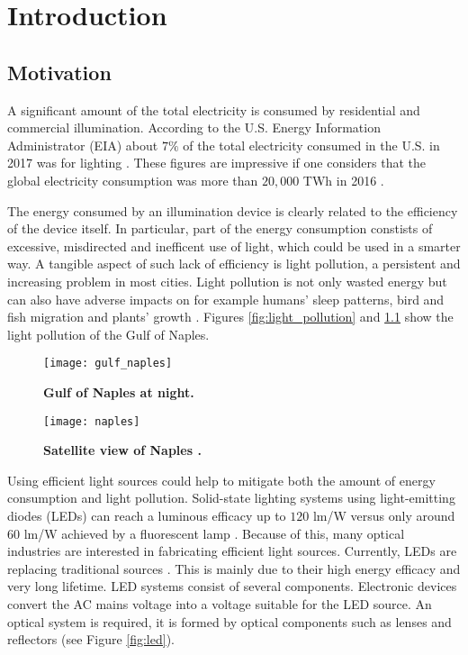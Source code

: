 \chapter{Introduction}
\section{Motivation}
A significant amount of the total electricity is consumed by residential and commercial illumination.
According to the U.S. Energy Information Administrator (EIA) about $7\%$ of the total electricity consumed in the U.S. in 2017 was for lighting \cite{electricity_light}. These figures are impressive if one considers that the global electricity consumption was more than $20,000$ TWh in 2016 \cite{statistic}. 

The energy consumed by an illumination device is clearly related to the efficiency of the device itself. 
In particular, part of the energy consumption constists of excessive, misdirected and inefficent use of light, which could be used in a smarter way. A tangible aspect of such lack of efficiency is light pollution, a persistent and increasing problem in most cities. Light pollution is not only wasted energy but can also have adverse impacts on for example humans’ sleep patterns, bird and fish migration and plants’ growth \cite{bergesen2016potential}. Figures \ref{fig:light_pollution} and \ref{fig:light_pollution2} show the light pollution of the Gulf of Naples.
\begin{figure}[t]
  \begin{minipage}[t]{0.49\textwidth}
    \texttt{[image: gulf\_naples]}
    \caption{\textbf{Gulf of Naples at night.}}
    \label{fig:light_pollution}
\end{minipage}
\hfill
 \begin{minipage}[t]{ 0.49\textwidth}
    \texttt{[image: naples]}
    \caption{\textbf{Satellite view of Naples \cite{nasa_image}.}}
    \label{fig:light_pollution2}
\end{minipage}
  \end{figure}

Using efficient light sources could help to mitigate both the amount of energy consumption and light pollution. %
Solid-state lighting systems using light-emitting diodes (LEDs) can reach a luminous efficacy up to $120$ \textrm{lm}/\textrm{W} versus only around $60$ \textrm{lm}/\textrm{W} achieved by a fluorescent lamp \cite{bergesen2016potential, humphreys2008solid}.
Because of this, many optical industries are interested in fabricating efficient light sources.
Currently, LEDs are replacing traditional sources \cite{koshel2012illumination}. 
This is mainly due to their high energy efficacy and very long lifetime. 
LED systems consist of several components. 
Electronic devices convert the AC mains voltage into a voltage suitable for the LED source.
An optical system is required, it is formed by optical components such as lenses and reflectors \cite{moreno2008modeling} (see Figure \ref{fig:led}).


